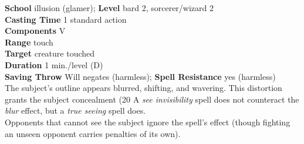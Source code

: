 \textbf{School} illusion (glamer); \textbf{Level} bard 2, sorcerer/wizard 2\\
\textbf{Casting Time} 1 standard action\\
\textbf{Components} V\\
\textbf{Range} touch\\
\textbf{Target} creature touched\\
\textbf{Duration} 1 min./level (D)\\
\textbf{Saving Throw }Will negates (harmless); \textbf{Spell Resistance} yes (harmless)\\
The subject's outline appears blurred, shifting, and wavering. This distortion grants the subject concealment (20%
A \textit{see invisibility }spell does not counteract the \textit{blur }effect, but a \textit{true seeing }spell does.\\
Opponents that cannot see the subject ignore the spell's effect (though fighting an unseen opponent carries penalties of its own).\\

